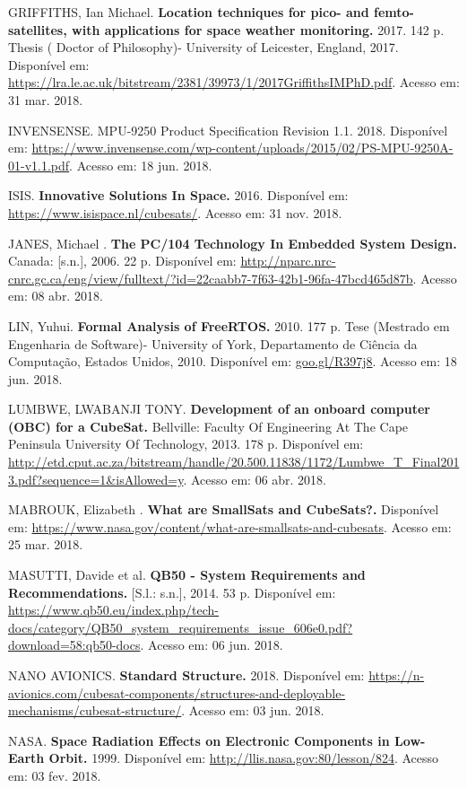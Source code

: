 \noindent GRIFFITHS, Ian Michael. \textbf{Location techniques for pico- and femto-satellites, with applications for space weather monitoring. } 2017. 142 p. Thesis ( Doctor of Philosophy)- University of Leicester, England, 2017. Disponível em: \url{https://lra.le.ac.uk/bitstream/2381/39973/1/2017GriffithsIMPhD.pdf}. Acesso em: 31 mar. 2018.

\noindent INVENSENSE. MPU-9250 Product Specification Revision 1.1. 2018. Disponível em: \url{https://www.invensense.com/wp-content/uploads/2015/02/PS-MPU-9250A-01-v1.1.pdf}. Acesso em: 18 jun. 2018.

\noindent ISIS. \textbf{Innovative Solutions In Space. } 2016. Disponível em: \url{https://www.isispace.nl/cubesats/}. Acesso em: 31 nov. 2018.

\noindent JANES, Michael . \textbf{The PC/104 Technology In Embedded System Design. } Canada: [s.n.], 2006. 22 p. Disponível em: \url{http://nparc.nrc-cnrc.gc.ca/eng/view/fulltext/?id=22caabb7-7f63-42b1-96fa-47bcd465d87b}. Acesso em: 08 abr. 2018.

\noindent LIN, Yuhui. \textbf{Formal Analysis of FreeRTOS.} 2010. 177 p. Tese (Mestrado em Engenharia de Software)- University of York, Departamento de Ciência da Computação, Estados Unidos, 2010. Disponível em: \url{goo.gl/R397j8}. Acesso em: 18 jun. 2018.

\noindent LUMBWE, LWABANJI TONY. \textbf{Development of an onboard computer (OBC) for a CubeSat. } Bellville: Faculty Of Engineering At The Cape Peninsula University Of Technology, 2013. 178 p. Disponível em: \url{http://etd.cput.ac.za/bitstream/handle/20.500.11838/1172/Lumbwe_T_Final2013.pdf?sequence=1&isAllowed=y}. Acesso em: 06 abr. 2018.

\noindent MABROUK, Elizabeth . \textbf{What are SmallSats and CubeSats?. } Disponível em: \url{https://www.nasa.gov/content/what-are-smallsats-and-cubesats}. Acesso em: 25 mar. 2018.

\noindent MASUTTI, Davide et al. \textbf{QB50 - System Requirements and Recommendations.} [S.l.: s.n.], 2014. 53 p. Disponível em: \url{https://www.qb50.eu/index.php/tech-docs/category/QB50_system_requirements_issue_606e0.pdf?download=58:qb50-docs}. Acesso em: 06 jun. 2018.

\noindent NANO AVIONICS. \textbf{Standard Structure. } 2018. Disponível em: \url{https://n-avionics.com/cubesat-components/structures-and-deployable-mechanisms/cubesat-structure/}. Acesso em: 03 jun. 2018.

\noindent NASA. \textbf{Space Radiation Effects on Electronic Components in Low-Earth Orbit. } 1999. Disponível em: \url{http://llis.nasa.gov:80/lesson/824}. Acesso em: 03 fev. 2018.


